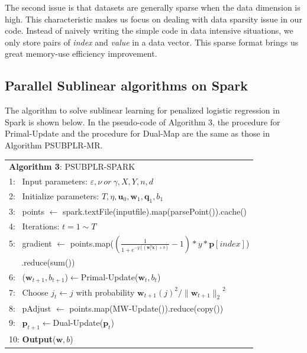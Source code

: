 \documentclass[10pt, conference, compsocconf]{IEEEtran}
\newcommand{\bw}{\mathbf{w}}
\newcommand{\bp}{\mathbf{p}}
\newcommand{\bq}{\mathbf{q}}
\newcommand{\lc}{\left(}
\newcommand{\rc}{\right)}
\newcommand{\lj}{\lc j\rc}
\newcommand{\tspace}{\hspace*{2em}}
\begin{document}

The second issue is that datasets are generally sparse when the data dimension is high. This characteristic makes us focus on dealing with data sparsity issue in our code. Instead of naively writing the simple code in data intensive situations, we only store pairs of \textit{index} and \textit{value} in a data vector.
This sparse format brings us great memory-use efficiency improvement.

\subsection{Parallel Sublinear algorithms on Spark}
The algorithm to solve sublinear learning for penalized logistic regression in Spark is shown below.
In the pseudo-code of Algorithm 3, the procedure for Primal-Update and the procedure for Dual-Map are the same as those in Algorithm PSUBPLR-MR.
    \begin{table}[ht]
	\begin{tabular}{l}
    \hline\noalign{\smallskip}
	\textbf{Algorithm 3}: PSUBPLR-SPARK \\
	\noalign{\smallskip}
	\hline
	\noalign{\smallskip}
    1:  ~Input parameters: $\varepsilon, \nu~or~\gamma, X, Y, n, d$ \\
    2:	~Initialize parameters: $T, \eta, {\mathbf{u}}_{0}, {\bw}_{1}, {\mathbf{\bq}}_{1}, {b}_{1}$\\
    3:  ~points $\leftarrow$ spark.textFile(inputfile).map(parsePoint()).cache() \\
    4:  ~Iterations: $t=1 \sim T$ \\
    5:  ~\tspace gradient $\leftarrow$ points.map($(\frac{1}{1+e^{-y((\bw_t^T \textbf{x})+b)}}-1) * y * \bp [index]$) \\
        ~~~\tspace\tspace\tspace\tspace\tspace .reduce(sum()) \\
    6:  ~\tspace ($\bw_{t+1}, b_{t+1}$)$\leftarrow$Primal-Update($\bw_t, b_t$) \\
    7:  ~\tspace Choose $j_t \leftarrow j$ with probability ${{\bw}_{t+1}\lj}^{2}/{\|{\bw}_{t+1}\|_2}^{2} $ \\
    8:  ~\tspace pAdjust $\leftarrow$ points.map(MW-Update()).reduce(copy()) \\
    9:  ~\tspace $\bp_{t+1}\leftarrow$Dual-Update($\bp_t$)  \\
    10: \textbf{Output}($\bw, b$) \\
    \hline
    \end{tabular}
	\end{table}
\end{document}

